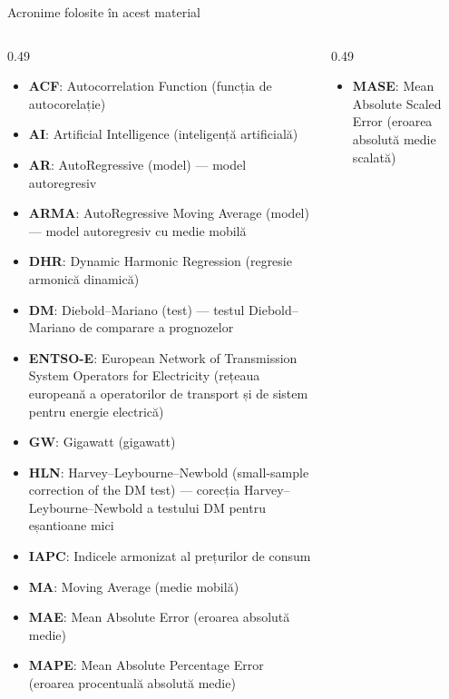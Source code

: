 {
\begin{frame}[noframenumbering]
    \titlepage
\end{frame}
}
\begin{frame}{Acronime folosite în acest material}
\begin{columns}[T]
\begin{column}{0.49\textwidth}
\begin{itemize}\setlength{\itemsep}{0pt}
    \item \textbf{ACF}: Autocorrelation Function (funcția de autocorelație)
    \item \textbf{AI}: Artificial Intelligence (inteligență artificială)
    \item \textbf{AR}: AutoRegressive (model) — model autoregresiv
    \item \textbf{ARMA}: AutoRegressive Moving Average (model) — model autoregresiv cu medie mobilă
    \item \textbf{DHR}: Dynamic Harmonic Regression (regresie armonică dinamică)
    \item \textbf{DM}: Diebold–Mariano (test) — testul Diebold–Mariano de comparare a prognozelor
    \item \textbf{ENTSO-E}: European Network of Transmission System Operators for Electricity (rețeaua europeană a operatorilor de transport și de sistem pentru energie electrică)
    \item \textbf{GW}: Gigawatt (gigawatt)
    \item \textbf{HLN}: Harvey–Leybourne–Newbold (small-sample correction of the DM test) — corecția Harvey–Leybourne–Newbold a testului DM pentru eșantioane mici
    \item \textbf{IAPC}: Indicele armonizat al prețurilor de consum
    \item \textbf{MA}: Moving Average (medie mobilă)
    \item \textbf{MAE}: Mean Absolute Error (eroarea absolută medie)
    \item \textbf{MAPE}: Mean Absolute Percentage Error (eroarea procentuală absolută medie)
\end{itemize}
\end{column}
\begin{column}{0.49\textwidth}
\begin{itemize}\setlength{\itemsep}{0pt}
    \item \textbf{MASE}: Mean Absolute Scaled Error (eroarea absolută medie scalată)

\end{itemize}
\end{column}
\end{columns}
\end{frame}

